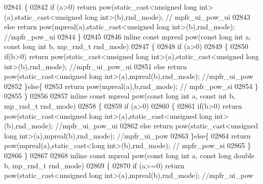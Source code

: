 \begin{DoxyCode}
{{02841 \{
02842     \textcolor{keywordflow}{if} (a>0) \textcolor{keywordflow}{return} pow(static\_cast<unsigned long int>(a),static\_cast<unsigned long int>(b),rnd\_mode);  \textcolor{comment}{//
      mpfr\_ui\_pow\_ui}
02843     \textcolor{keywordflow}{else}     \textcolor{keywordflow}{return} pow(mpreal(a),static\_cast<unsigned long int>(b),rnd\_mode); \textcolor{comment}{//mpfr\_pow\_ui}
02844 \}
02845 
02846 \textcolor{keyword}{inline} \textcolor{keyword}{const} mpreal pow(\textcolor{keyword}{const} \textcolor{keywordtype}{long} \textcolor{keywordtype}{int} a, \textcolor{keyword}{const} \textcolor{keywordtype}{long} \textcolor{keywordtype}{int} b, mp\_rnd\_t rnd\_mode)
02847 \{
02848     \textcolor{keywordflow}{if} (a>0)
02849     \{
02850         \textcolor{keywordflow}{if}(b>0) \textcolor{keywordflow}{return} pow(static\_cast<unsigned long int>(a),static\_cast<unsigned long int>(b),rnd\_mode); \textcolor{comment}{
      //mpfr\_ui\_pow\_ui}
02851         \textcolor{keywordflow}{else}    \textcolor{keywordflow}{return} pow(static\_cast<unsigned long int>(a),mpreal(b),rnd\_mode); \textcolor{comment}{//mpfr\_ui\_pow}
02852     \}\textcolor{keywordflow}{else}\{
02853         \textcolor{keywordflow}{return} pow(mpreal(a),b,rnd\_mode); \textcolor{comment}{// mpfr\_pow\_si}
02854     \}
02855 \}
02856 
02857 \textcolor{keyword}{inline} \textcolor{keyword}{const} mpreal pow(\textcolor{keyword}{const} \textcolor{keywordtype}{long} \textcolor{keywordtype}{int} a, \textcolor{keyword}{const} \textcolor{keywordtype}{int} b, mp\_rnd\_t rnd\_mode)
02858 \{
02859     \textcolor{keywordflow}{if} (a>0)
02860     \{
02861         \textcolor{keywordflow}{if}(b>0) \textcolor{keywordflow}{return} pow(static\_cast<unsigned long int>(a),static\_cast<unsigned long int>(b),rnd\_mode); \textcolor{comment}{
      //mpfr\_ui\_pow\_ui}
02862         \textcolor{keywordflow}{else}    \textcolor{keywordflow}{return} pow(static\_cast<unsigned long int>(a),mpreal(b),rnd\_mode); \textcolor{comment}{//mpfr\_ui\_pow}
02863     \}\textcolor{keywordflow}{else}\{
02864         \textcolor{keywordflow}{return} pow(mpreal(a),static\_cast<long int>(b),rnd\_mode); \textcolor{comment}{// mpfr\_pow\_si}
02865     \}
02866 \}
02867 
02868 \textcolor{keyword}{inline} \textcolor{keyword}{const} mpreal pow(\textcolor{keyword}{const} \textcolor{keywordtype}{long} \textcolor{keywordtype}{int} a, \textcolor{keyword}{const} \textcolor{keywordtype}{long} \textcolor{keywordtype}{double} b, mp\_rnd\_t rnd\_mode)
02869 \{
02870     \textcolor{keywordflow}{if} (a>=0)   \textcolor{keywordflow}{return} pow(static\_cast<unsigned long int>(a),mpreal(b),rnd\_mode); \textcolor{comment}{//mpfr\_ui\_pow}
}}
\end{DoxyCode}
